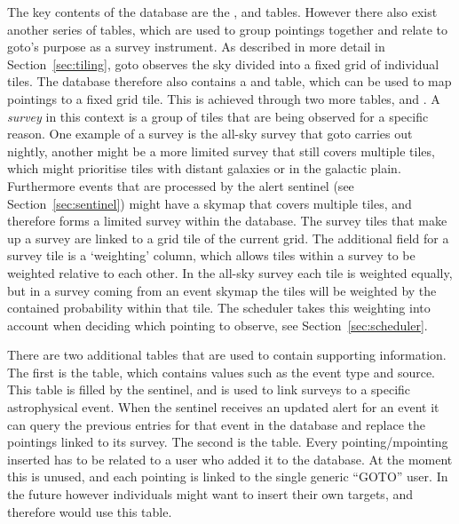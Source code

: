 \begin{colsection}
\begin{colsection}
The key contents of the database are the ,  and  tables. However there also exist another series of tables, which are used to group pointings together and relate to \gls{goto}'s purpose as a survey instrument. As described in more detail in Section~\ref{sec:tiling}, \gls{goto} observes the sky divided into a fixed grid of individual tiles. The database therefore also contains a and  table, which can be used to map pointings to a fixed grid tile. This is achieved through two more tables,  and . A \textit{survey} in this context is a group of tiles that are being observed for a specific reason. One example of a survey is the all-sky survey that \gls{goto} carries out nightly, another might be a more limited survey that still covers multiple tiles, which might prioritise tiles with distant galaxies or in the galactic plain. Furthermore events that are processed by the alert sentinel (see Section~\ref{sec:sentinel}) might have a skymap that covers multiple tiles, and therefore forms a limited survey within the database. The survey tiles that make up a survey are linked to a grid tile of the current grid. The additional field for a survey tile is a `weighting' column, which allows tiles within a survey to be weighted relative to each other. In the all-sky survey each tile is weighted equally, but in a survey coming from an event skymap the tiles will be weighted by the contained probability within that tile. The scheduler takes this weighting into account when deciding which pointing to observe, see Section~\ref{sec:scheduler}.

There are two additional tables that are used to contain supporting information. The first is the  table, which contains values such as the event type and source. This table is filled by the sentinel, and is used to link surveys to a specific astrophysical event. When the sentinel receives an updated alert for an event it can query the previous entries for that event in the database and replace the pointings linked to its survey. The second is the  table. Every pointing/mpointing inserted has to be related to a user who added it to the database. At the moment this is unused, and each pointing is linked to the single generic ``GOTO'' user. In the future however individuals might want to insert their own targets, and therefore would use this table.

\end{colsection}


\end{colsection}
